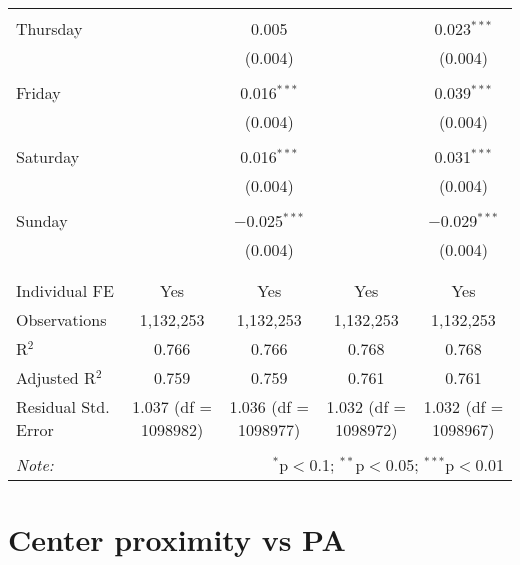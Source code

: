 \documentclass[
]{article}
\begin{document}
\begin{table}[!htbp]
{\begin{tabular}{@{\extracolsep{5pt}}lcccc}
  & & & & \\ 
 Thursday &  & 0.005 &  & 0.023$^{***}$ \\ 
  &  & (0.004) &  & (0.004) \\ 
  & & & & \\ 
 Friday &  & 0.016$^{***}$ &  & 0.039$^{***}$ \\ 
  &  & (0.004) &  & (0.004) \\ 
  & & & & \\ 
 Saturday &  & 0.016$^{***}$ &  & 0.031$^{***}$ \\ 
  &  & (0.004) &  & (0.004) \\ 
  & & & & \\ 
 Sunday &  & $-$0.025$^{***}$ &  & $-$0.029$^{***}$ \\ 
  &  & (0.004) &  & (0.004) \\ 
  & & & & \\ 
\hline \\[-1.8ex] 
Individual FE & Yes & Yes & Yes & Yes \\ 
Observations & 1,132,253 & 1,132,253 & 1,132,253 & 1,132,253 \\ 
R$^{2}$ & 0.766 & 0.766 & 0.768 & 0.768 \\ 
Adjusted R$^{2}$ & 0.759 & 0.759 & 0.761 & 0.761 \\ 
Residual Std. Error & 1.037 (df = 1098982) & 1.036 (df = 1098977) & 1.032 (df = 1098972) & 1.032 (df = 1098967) \\ 
\hline 
\hline \\[-1.8ex] 
\textit{Note:}  & \multicolumn{4}{r}{$^{*}$p$<$0.1; $^{**}$p$<$0.05; $^{***}$p$<$0.01} \\ 
\end{tabular}
} 
\end{table} 
\newpage
\section{Center proximity vs PA}
\end{document}
